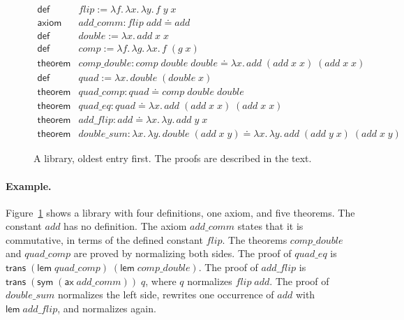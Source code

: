 \documentclass[acmsmall,nonacm,screen]{acmart}
\newcommand{\eqd}{\doteq}
\newcommand{\kw}[1]{\mathsf{#1}}
\newcommand{\nm}[1]{\mathit{#1}}
\begin{document}
\begin{figure}
\[
\begin{array}{ll}
\kw{def} & \nm{flip} := \lambda f.\,\lambda x.\,\lambda y.\,f\;y\;x \\
\kw{axiom} & \nm{add\_comm} : \nm{flip}\;\nm{add} \eqd \nm{add} \\
\kw{def} & \nm{double} := \lambda x.\,\nm{add}\;x\;x \\
\kw{def} & \nm{comp} := \lambda f.\,\lambda g.\,\lambda x.\,f\;(g\;x) \\
\kw{theorem} & \nm{comp\_double} : \nm{comp}\;\nm{double}\;\nm{double} \eqd
  \lambda x.\,\nm{add}\;(\nm{add}\;x\;x)\;(\nm{add}\;x\;x) \\
\kw{def} & \nm{quad} := \lambda x.\,\nm{double}\;(\nm{double}\;x) \\
\kw{theorem} & \nm{quad\_comp} : \nm{quad} \eqd \nm{comp}\;\nm{double}\;\nm{double} \\
\kw{theorem} & \nm{quad\_eq} : \nm{quad} \eqd
  \lambda x.\,\nm{add}\;(\nm{add}\;x\;x)\;(\nm{add}\;x\;x) \\
\kw{theorem} & \nm{add\_flip} : \nm{add} \eqd \lambda x.\,\lambda y.\,\nm{add}\;y\;x \\
\kw{theorem} & \nm{double\_sum} : \lambda x.\,\lambda y.\,\nm{double}\;(\nm{add}\;x\;y) \eqd
  \lambda x.\,\lambda y.\,\nm{add}\;(\nm{add}\;y\;x)\;(\nm{add}\;x\;y)
\end{array}
\]
\caption{A library, oldest entry first. The proofs are described in the text.}
\label{fig:example}
\end{figure}

\paragraph{Example.}
Figure~\ref{fig:example} shows a library with four definitions, one axiom, and five theorems.
The constant $\nm{add}$ has no definition. The axiom $\nm{add\_comm}$ states that it is
commutative, in terms of the defined constant $\nm{flip}$. The theorems $\nm{comp\_double}$ and
$\nm{quad\_comp}$ are proved by normalizing both sides. The proof of $\nm{quad\_eq}$ is
$\kw{trans}\;(\kw{lem}\;\nm{quad\_comp})\;(\kw{lem}\;\nm{comp\_double})$. The proof of
$\nm{add\_flip}$ is $\kw{trans}\;(\kw{sym}\;(\kw{ax}\;\nm{add\_comm}))\;q$, where $q$ normalizes
$\nm{flip}\;\nm{add}$. The proof of $\nm{double\_sum}$ normalizes the left side, rewrites one
occurrence of $\nm{add}$ with $\kw{lem}\;\nm{add\_flip}$, and normalizes again.
\end{document}
